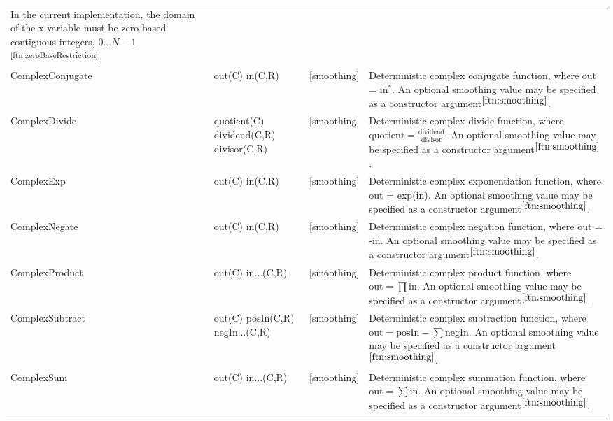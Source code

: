 \begin{longtable} {p{3.5cm} p{2.2cm} p{2cm} p{7cm}}
In the current implementation, the domain of the x variable must be zero-based contiguous integers, $0...N-1$\textsuperscript{\ref{ftn:zeroBaseRestriction}}. \\
%
ComplexConjugate & out(C) \newline in(C,R) & [smoothing] & Deterministic complex conjugate function, where out = in$^{*}$. An optional smoothing value may be specified as a constructor argument$^{\ref{ftn:smoothing}}$. \\
%
ComplexDivide & quotient(C) \newline dividend(C,R) \newline divisor(C,R) & [smoothing] & Deterministic complex divide function, where $\mathrm{quotient} = \frac{\mathrm{dividend}}{\mathrm{divisor}}$. An optional smoothing value may be specified as a constructor argument$^{\ref{ftn:smoothing}}$. \\
%
ComplexExp & out(C) \newline in(C,R) & [smoothing] & Deterministic complex exponentiation function, where out = exp(in). An optional smoothing value may be specified as a constructor argument$^{\ref{ftn:smoothing}}$. \\
%
ComplexNegate & out(C) \newline in(C,R) & [smoothing] & Deterministic complex negation function, where out = -in. An optional smoothing value may be specified as a constructor argument$^{\ref{ftn:smoothing}}$. \\
%
ComplexProduct & out(C) \newline in...(C,R) & [smoothing] & Deterministic complex product function, where $\mathrm{out} = \prod \mathrm{in}$. An optional smoothing value may be specified as a constructor argument$^{\ref{ftn:smoothing}}$. \\
%
ComplexSubtract & out(C) \newline posIn(C,R) \newline negIn...(C,R) & [smoothing] & Deterministic complex subtraction function, where $\mathrm{out} = \mathrm{posIn} - \sum \mathrm{negIn}$. An optional smoothing value may be specified as a constructor argument$^{\ref{ftn:smoothing}}$. \\
%
ComplexSum & out(C) \newline in...(C,R) & [smoothing] & Deterministic complex summation function, where $\mathrm{out} = \sum \mathrm{in}$. An optional smoothing value may be specified as a constructor argument$^{\ref{ftn:smoothing}}$. \\

\end{longtable}
